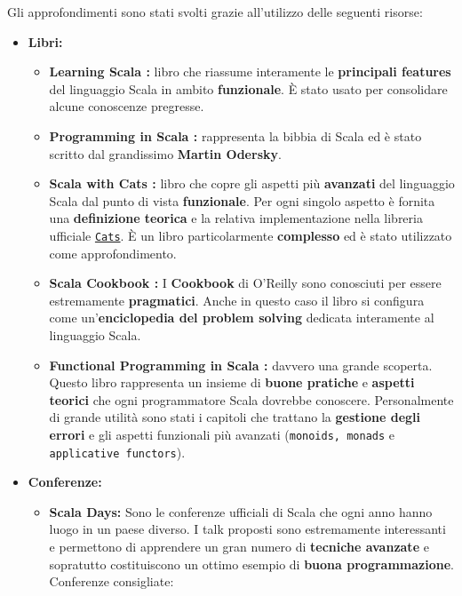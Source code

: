 Gli approfondimenti sono stati svolti grazie all'utilizzo delle seguenti risorse:
\begin{itemize}
	\item{\textbf{Libri:}}
	\begin{itemize}
		\item{\textbf{Learning Scala \cite{scalaLearning:2014}:}} libro che riassume interamente le \textbf{principali features} del linguaggio Scala in ambito \textbf{funzionale}. È stato usato per consolidare alcune conoscenze pregresse.
		\item{\textbf{Programming in Scala \cite{scalaBook:2014}:}} rappresenta la bibbia di Scala ed è stato scritto dal grandissimo \textbf{Martin Odersky}.
		\item{\textbf{Scala with Cats \cite{scalaCats:2020}:}} libro che copre gli aspetti più \textbf{avanzati} del linguaggio Scala dal punto di vista \textbf{funzionale}. Per ogni singolo aspetto è fornita una \textbf{definizione teorica} e la relativa implementazione nella libreria ufficiale \href{https://typelevel.org/cats-effect/}{\texttt{Cats}}. È un libro particolarmente \textbf{complesso} ed è stato utilizzato come approfondimento.
		\item{\textbf{Scala Cookbook \cite{scalaCook:2013}:}} I \textbf{Cookbook} di O'Reilly sono conosciuti per essere estremamente \textbf{pragmatici}. Anche in questo caso il libro si configura come un'\textbf{enciclopedia del problem solving} dedicata interamente al linguaggio Scala.
		\item{\textbf{Functional Programming in Scala \cite{functionalScala:2014}:}} davvero una grande scoperta. Questo libro rappresenta un insieme di \textbf{buone pratiche} e \textbf{aspetti teorici} che ogni programmatore Scala dovrebbe conoscere. Personalmente di grande utilità sono stati i capitoli che trattano la \textbf{gestione degli errori} e gli aspetti funzionali più avanzati (\texttt{monoids, monads} e \texttt{applicative functors}).  
	\end{itemize}
	\item{\textbf{Conferenze:}}
	\begin{itemize}
		\item{\textbf{Scala Days:}}
		Sono le conferenze ufficiali di Scala che ogni anno hanno luogo in un paese diverso. I talk proposti sono estremamente interessanti e permettono di apprendere un gran numero di \textbf{tecniche avanzate} e sopratutto costituiscono un ottimo esempio di \textbf{buona programmazione}.
		Conferenze consigliate:
		\begin{itemize}

\end{itemize}
\end{itemize}
\end{itemize}
